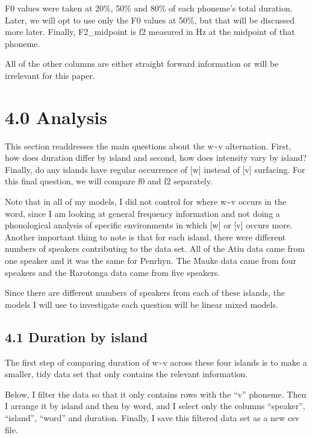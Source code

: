 \documentclass[
  ,man,floatsintext]{apa6}
\begin{document}
F0 values were taken at 20\%, 50\% and 80\% of each phoneme's total duration. Later, we will opt to use only the F0 values at 50\%, but that will be discussed more later. Finally, F2\_midpoint is f2 measured in Hz at the midpoint of that phoneme.

All of the other columns are either straight forward information or will be irrelevant for this paper.

\section{4.0 Analysis}\label{analysis}

This section readdresses the main questions about the w\textasciitilde v alternation. First, how does duration differ by island and second, how does intensity vary by island? Finally, do any islands have regular occurrence of {[}w{]} instead of {[}v{]} surfacing. For this final question, we will compare f0 and f2 separately.

Note that in all of my models, I did not control for where w\textasciitilde v occurs in the word, since I am looking at general frequency information and not doing a phonological analysis of specific environments in which {[}w{]} or {[}v{]} occurs more. Another important thing to note is that for each island, there were different numbers of speakers contributing to the data set. All of the Atiu data came from one speaker and it was the same for Penrhyn. The Mauke data came from four speakers and the Rarotonga data came from five speakers.

Since there are different numbers of speakers from each of these islands, the models I will use to investigate each question will be linear mixed models.

\subsection{4.1 Duration by island}\label{duration-by-island}

The first step of comparing duration of w\textasciitilde v across these four islands is to make a smaller, tidy data set that only contains the relevant information.

Below, I filter the data so that it only contains rows with the ``v'' phoneme. Then I arrange it by island and then by word, and I select only the columns ``speaker'', ``island'', ``word'' and duration. Finally, I save this filtered data set as a new csv file.
\end{document}
